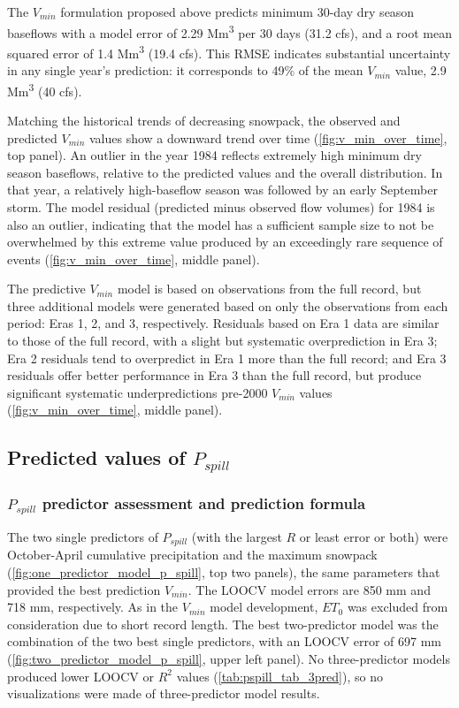 \documentclass[hess, manuscript]{copernicus}
\begin{document}
The \(V_{min}\) formulation proposed above predicts minimum 30-day dry
season baseflows with a model error of 2.29 Mm\textsuperscript{3} per 30
days (31.2 cfs), and a root mean squared error of 1.4
Mm\textsuperscript{3} (19.4 cfs). This RMSE indicates substantial
uncertainty in any single year's prediction: it corresponds to 49\% of
the mean \(V_{min}\) value, 2.9 Mm\textsuperscript{3} (40 cfs).

Matching the historical trends of decreasing snowpack, the observed and
predicted \(V_{min}\) values show a downward trend over time
(\autoref{fig:v_min_over_time}, top panel). An outlier in the year 1984
reflects extremely high minimum dry season baseflows, relative to the
predicted values and the overall distribution. In that year, a
relatively high-baseflow season was followed by an early September
storm. The model residual (predicted minus observed flow volumes) for
1984 is also an outlier, indicating that the model has a sufficient
sample size to not be overwhelmed by this extreme value produced by an
exceedingly rare sequence of events (\autoref{fig:v_min_over_time},
middle panel).

The predictive \(V_{min}\) model is based on observations from the full
record, but three additional models were generated based on only the
observations from each period: Eras 1, 2, and 3, respectively. Residuals
based on Era 1 data are similar to those of the full record, with a
slight but systematic overprediction in Era 3; Era 2 residuals tend to
overpredict in Era 1 more than the full record; and Era 3 residuals
offer better performance in Era 3 than the full record, but produce
significant systematic underpredictions pre-2000 \(V_{min}\) values
(\autoref{fig:v_min_over_time}, middle panel).

\subsection{\texorpdfstring{Predicted values of
\(P_{spill}\)}{Predicted values of P\_\{spill\}}}

\subsubsection{\texorpdfstring{\(P_{spill}\) predictor assessment and
prediction
formula}{P\_\{spill\} predictor assessment and prediction formula}}

The two single predictors of \(P_{spill}\) (with the largest \(R\) or
least error or both) were October-April cumulative precipitation and the
maximum snowpack (\autoref{fig:one_predictor_model_p_spill}, top two
panels), the same parameters that provided the best prediction
\(V_{min}\). The LOOCV model errors are 850 mm and 718 mm, respectively.
As in the \(V_{min}\) model development, \(ET_{0}\) was excluded from
consideration due to short record length. The best two-predictor model
was the combination of the two best single predictors, with an LOOCV
error of 697 mm (\autoref{fig:two_predictor_model_p_spill}, upper left
panel). No three-predictor models produced lower LOOCV or \(R^2\) values
(\autoref{tab:pspill_tab_3pred}), so no visualizations were made of
three-predictor model results.
\end{document}
